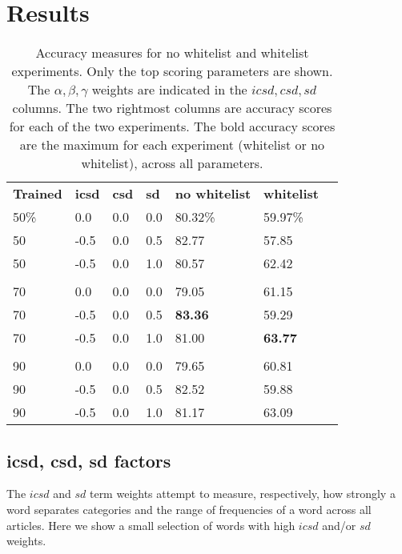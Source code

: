 \documentclass{article}
\begin{document}
\section{Results}

\begin{table}[ht]
  \begin{center}
  \begin{tabular}{lllllll}
    \textbf{Trained} & \textbf{icsd} & \textbf{csd} & \textbf{sd} &
    \textbf{no whitelist} & \textbf{whitelist}\\

    50\% & 0.0 & 0.0 & 0.0 & 80.32\% & 59.97\%\\
    50 & -0.5 & 0.0 & 0.5 & 82.77 & 57.85\\
    50 & -0.5 & 0.0 & 1.0 & 80.57 & 62.42\\
    &  &  &  &  & \\
    70 & 0.0 & 0.0 & 0.0 & 79.05 & 61.15\\
    70 & -0.5 & 0.0 & 0.5 & {\textbf{83.36}} & 59.29\\
    70 & -0.5 & 0.0 & 1.0 & 81.00 & {\textbf{63.77}}\\
    &  &  &  &  & \\
    90 & 0.0 & 0.0 & 0.0 & 79.65 & 60.81\\
    90 & -0.5 & 0.0 & 0.5 & 82.52 & 59.88\\
    90 & -0.5 & 0.0 & 1.0 & 81.17 & 63.09
  \end{tabular}
  \end{center}

  \caption{Accuracy measures for no whitelist and whitelist experiments. Only
the top scoring parameters are shown. The $\alpha,\beta,\gamma$ weights are
indicated in the $icsd,csd,sd$ columns. The two rightmost columns are accuracy
scores for each of the two experiments. The bold accuracy scores are the
maximum for each experiment (whitelist or no whitelist), across all
parameters.}

  \label{table:accuracy}
\end{table}

\subsection{icsd, csd, sd factors}

The $icsd$ and $sd$ term weights attempt to measure, respectively, how strongly
a word separates categories and the range of frequencies of a word across all
articles. Here we show a small selection of words with high $icsd$ and/or $sd$
weights.
\end{document}
